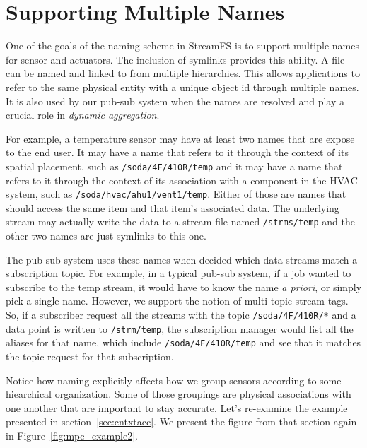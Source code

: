 \section{Supporting Multiple Names}

One of the goals of the naming scheme in StreamFS is to support multiple names for sensor and actuators.  The inclusion of symlinks 
provides this ability.  A file can be named and linked to from multiple hierarchies.  This allows applications to refer
to the same physical entity with a unique object id through multiple names.  It is also used by our pub-sub system when
the names are resolved and play a crucial role in \emph{dynamic aggregation}.

For example, a temperature sensor may have at least two names that are expose to the end user.  It may have a name that refers to 
it through the context of its spatial placement, such as \texttt{/soda/4F/410R/temp} and it may have a name that refers to it 
through the context of its association with a component in the HVAC system, such as \texttt{/soda/hvac/ahu1/vent1/temp}.  Either
of those are names that should access the same item and that item's associated data.  The underlying stream may actually write
the data to a stream file named \texttt{/strms/temp} and the other two names are just symlinks to this one.  

The pub-sub system uses these names when decided which data streams match a subscription topic.  For example, in a typical pub-sub system,
if a job wanted to subscribe to the temp stream, it would have to know the name \emph{a priori}, or simply pick a single name.
However, we support the notion of multi-topic stream tags.  So, if a subscriber request all the streams with the topic 
\texttt{/soda/4F/410R/*} and a data point is written to \texttt{/strm/temp}, the subscription manager would list all the aliases
for that name, which include \texttt{/soda/4F/410R/temp} and see that it matches the topic request for that subscription.

Notice how naming explicitly affects how we group sensors according to some hiearchical organization.  Some of those groupings
are physical associations with one another that are important to stay accurate.  Let's re-examine the example presented in
section~\ref{sec:cntxtacc}.  We present the figure from that section again in Figure~\ref{fig:mpc_example2}.


